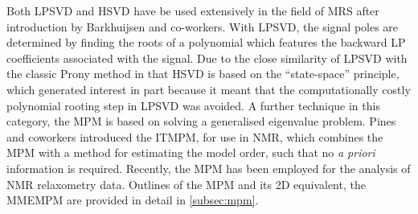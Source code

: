 Both \ac{LPSVD}\cite{Kumaresan1982,Kumaresan1983} and
\ac{HSVD}\cite{Kung1983} have be used extensively in the field of \ac{MRS}
after introduction by Barkhuijsen and
co-workers\cite{Barkhuijsen1985a,Barkhuijsen1985b,Barkhuijsen1987,Beer1988,Pijnappel1992}.
With
\ac{LPSVD}, the signal poles are determined by finding the roots of a
polynomial which features the backward \ac{LP} coefficients associated with the signal.
Due to the close similarity of \ac{LPSVD} with the
classic Prony method\cite{Prony1795} in that
\ac{HSVD} is
based on the ``state-space'' principle, which generated interest in part
because it meant that the computationally costly polynomial rooting step in
\ac{LPSVD} was avoided.
A further technique in this category, the
\ac{MPM}\cite{Hua1990,Hua1990b,Hua1991} is based on solving a generalised
eigenvalue problem.  Pines and coworkers introduced the \ac{ITMPM}\cite{Lin1997},
for use in \ac{NMR}, which combines the \ac{MPM} with a method for estimating
the model order, such that no \textit{a priori} information is required.
Recently, the \ac{MPM} has been employed for the analysis of \ac{NMR}
relaxometry data\cite{Fricke2020, Wortge2023}.
Outlines of the \ac{MPM} and its \ac{2D} equivalent, the
\ac{MMEMPM}\cite{Hua1992,Chen2007} are provided in detail in
\cref{subsec:mpm}.


